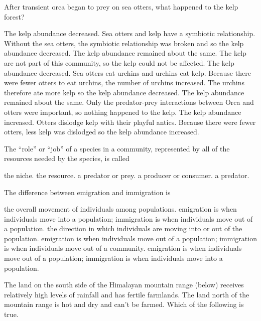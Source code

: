 \question
After transient orca began to prey on sea otters, what happened to the kelp forest?

\begin{choices}
\choice The kelp abundance decreased. Sea otters and kelp have a symbiotic relationship. Without the sea otters, the symbiotic relationship was broken and so the kelp abundance decreased.
\choice The kelp abundance remained about the same. The kelp are not part of this community, so the kelp could not be affected.
\correctchoice The kelp abundance decreased. Sea otters eat urchins and urchins eat kelp.  Because there were fewer otters to eat urchins, the number of urchins increased.  The urchins therefore ate more kelp so the kelp abundance decreased.
\choice The kelp abundance remained about the same. Only the predator-prey interactions between Orca and otters were important, so nothing happened to the kelp.
\choice The kelp abundance increased. Otters dislodge kelp with their playful antics.  Because there were fewer otters, less kelp was dislodged so the kelp abundance increased.
\end{choices}

\newpage

\question
The ``role'' or ``job'' of a species in a community, represented by all of the resources needed by the species, is called 

\begin{choices}
\correctchoice the niche.
\choice the resource.
\choice a predator or prey.
\choice a producer or consumer.
\choice a predator.
\end{choices}

\question
The difference between emigration and immigration is

\begin{choices}
\choice the overall movement of individuals among populations.
\choice emigration is when individuals move into a population; immigration is when individuals move out of a population.
\choice the direction in which individuals are moving into or out of the population.
\choice emigration is when individuals move out of a population; immigration is when individuals move out of a community.
\correctchoice emigration is when individuals move out of a population; immigration is when individuals move into a population.
\end{choices}

\question
The land on the south side of the Himalayan mountain range (below) receives relatively high levels of rainfall and has fertile farmlands.  The land north of the mountain range is hot and dry and can't be farmed.  Which of the following is true.

